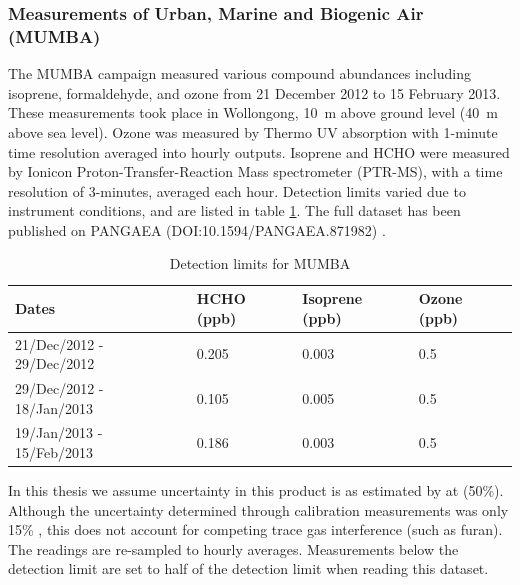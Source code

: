     
    \subsubsection{Measurements of Urban, Marine and Biogenic Air (MUMBA)}
    \label{Model:Datasets:MUMBA}
    
      The MUMBA campaign \parencite{PatonWalsh2017} measured various compound abundances including isoprene, formaldehyde, and ozone from 21 December 2012 to 15 February 2013.
      These measurements took place in Wollongong, 10~m above ground level (40~m above sea level).
      Ozone was measured by Thermo UV absorption with 1-minute time resolution averaged into hourly outputs.
      Isoprene and HCHO were measured by Ionicon Proton-Transfer-Reaction Mass spectrometer (PTR-MS), with a time resolution of 3-minutes, averaged each hour.
      Detection limits varied due to instrument conditions, and are listed in table \ref{Model:Datasets:MUMBA:tab_detectionlimits}.
      The full dataset has been published on PANGAEA (DOI:10.1594/PANGAEA.871982) \parencite{Guerette2018}.
      
      
      \begin{table}
        \caption{Detection limits for MUMBA}
        \begin{tabular}{  l |  l  l  l }
          
          \textbf{Dates} & \textbf{HCHO (ppb)} & \textbf{Isoprene (ppb)} & \textbf{Ozone (ppb)}
          \\ \hline
          21/Dec/2012 - 29/Dec/2012 & 0.205 & 0.003 & 0.5 \\
          29/Dec/2012 - 18/Jan/2013 & 0.105 & 0.005 & 0.5 \\
          19/Jan/2013 - 15/Feb/2013 & 0.186 & 0.003 & 0.5 \\
        \end{tabular}
        \label{Model:Datasets:MUMBA:tab_detectionlimits}
      \end{table}
      
      In this thesis we assume uncertainty in this product is as estimated by \textcite{Dunne2018} at (50\%).
      Although the uncertainty determined through calibration measurements was only 15\% \parencite{Guerette2018}, this does not account for competing trace gas interference (such as furan).
      The readings are re-sampled to hourly averages.
      Measurements below the detection limit are set to half of the detection limit when reading this dataset.
    
